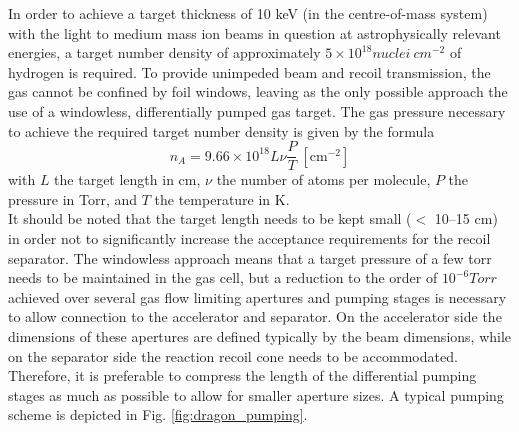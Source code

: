 In order to achieve a target thickness of 10 keV (in the centre-of-mass system) with the light to medium mass ion beams in question at astrophysically relevant energies, a target number density of approximately $5\times10^{18} \unit{nuclei~cm^{-2}}$ of hydrogen is required. To provide unimpeded beam and recoil transmission, the gas cannot be confined by foil windows, leaving as the only possible approach the use of a windowless, differentially pumped gas target. The gas pressure necessary to achieve the required target number density is given by the formula \cite{rolf88} 
\begin{equation}
n_A = 9.66\times10^{18} L \nu \frac{P}{T}~\mathrm{[cm^{-2}]}
\end{equation}
with $L$ the target length in cm, $\nu$ the number of atoms per molecule, $P$ the pressure in Torr, and $T$ the temperature in K.\\
It should be noted that the target length needs to be kept small ($<$ 10--15 cm) in order not to significantly increase the acceptance requirements for the recoil separator. The windowless approach means that a target pressure of a few torr needs to be maintained in the gas cell, but a reduction to the order of $10^{-6} \unit{Torr}$ achieved over several gas flow limiting apertures and pumping stages is necessary to allow connection to the accelerator and separator. On the accelerator side the dimensions of these apertures are defined typically by the beam dimensions, while on the separator side the reaction recoil cone needs to be accommodated. Therefore, it is preferable to compress the length of the differential pumping stages as much as possible to allow for smaller aperture sizes. A typical pumping scheme is depicted in Fig. \ref{fig:dragon_pumping}.
